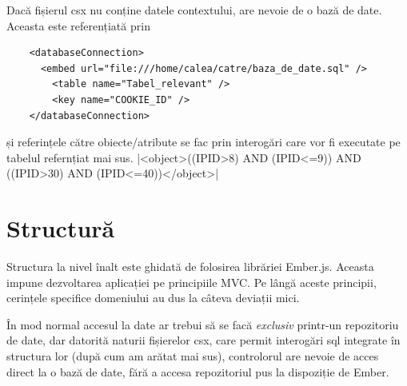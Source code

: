 \documentclass[12pt, a4paper, twoside, romanian]{teza-upb}
\begin{document}
    Dacă fișierul csx nu conține datele contextului, are nevoie de o bază de date. Aceasta este referențiată prin

    \begin{verbatim}
    <databaseConnection>
      <embed url="file:///home/calea/catre/baza_de_date.sql" />
        <table name="Tabel_relevant" />
        <key name="COOKIE_ID" />
    </databaseConnection>
    \end{verbatim}

  și referințele către obiecte/atribute se fac prin interogări care vor fi executate pe tabelul refernțiat mai sus. |<object>((IPID>8) AND (IPID<=9)) AND ((IPID>30) AND (IPID<=40))</object>|

  \section{Structură}

    Structura la nivel înalt este ghidată de folosirea librăriei Ember.js. Aceasta impune dezvoltarea aplicației pe principiile MVC. Pe lângă aceste principii, cerințele specifice domeniului au dus la câteva deviații mici. 
    
    În mod normal accesul la date ar trebui să se facă \textit{exclusiv} printr-un repozitoriu de date, dar datorită naturii fișierelor csx, care permit interogări sql integrate în structura lor (după cum am arătat mai sus), controlorul are nevoie de acces direct la o bază de date, fără a accesa repozitoriul pus la dispoziție de Ember.
\end{document}
